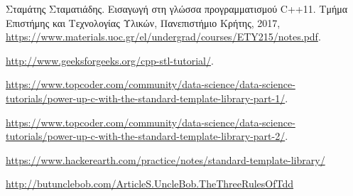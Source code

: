 \begin{thebibliography}{9}
Σταμάτης Σταματιάδης. Εισαγωγή στη γλώσσα προγραμματισμού C++11. Τμήμα Επιστήμης και Τεχνολογίας Υλικών, Πανεπιστήμιο Κρήτης, 2017, \href{https://www.materials.uoc.gr/el/undergrad/courses/ETY215/notes.pdf}{https://www.materials.uoc.gr/el/undergrad/courses/ETY215/notes.pdf}.

\href{http://www.geeksforgeeks.org/cpp-stl-tutorial/}{http://www.geeksforgeeks.org/cpp-stl-tutorial/}.

\href{https://www.topcoder.com/community/data-science/data-science-tutorials/power-up-c-with-the-standard-template-library-part-1/}{https://www.topcoder.com/community/data-science/data-science-tutorials/power-up-c-with-the-standard-template-library-part-1/}.

\href{https://www.topcoder.com/community/data-science/data-science-tutorials/power-up-c-with-the-standard-template-library-part-1/}{https://www.topcoder.com/community/data-science/data-science-tutorials/power-up-c-with-the-standard-template-library-part-2/}.

\href{https://www.hackerearth.com/practice/notes/standard-template-library/}{https://www.hackerearth.com/practice/notes/standard-template-library/}

\href{http://butunclebob.com/ArticleS.UncleBob.TheThreeRulesOfTdd}{http://butunclebob.com/ArticleS.UncleBob.TheThreeRulesOfTdd}



\end{thebibliography}

